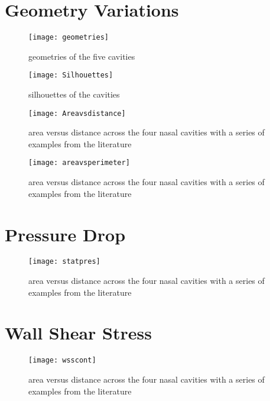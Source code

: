 \section{Geometry Variations}

\begin{figure} \label{fig:geo}
  \texttt{[image: geometries]}
  \caption{geometries of the five cavities}
\end{figure}

\begin{figure} \label{fig:sil}
  \texttt{[image: Silhouettes]}
  \caption{silhouettes of the cavities}
\end{figure}

\begin{figure} \label{fig:area}
  \texttt{[image: Areavsdistance]}
  \caption{area versus distance across the four nasal cavities with a series of examples from the literature}
\end{figure}

\begin{figure} \label{fig:arpar}
  \texttt{[image: areavsperimeter]}
  \caption{area versus distance across the four nasal cavities with a series of examples from the literature}
\end{figure}
\section{Pressure Drop}

\begin{table}
\centering
{}

\end{table}

\begin{figure} \label{fig:stpr}
  \texttt{[image: statpres]}
  \caption{area versus distance across the four nasal cavities with a series of examples from the literature}
\end{figure}

\section{Wall Shear Stress}

\begin{figure} \label{fig:wcont}
  \texttt{[image: wsscont]}
  \caption{area versus distance across the four nasal cavities with a series of examples from the literature}
\end{figure}

